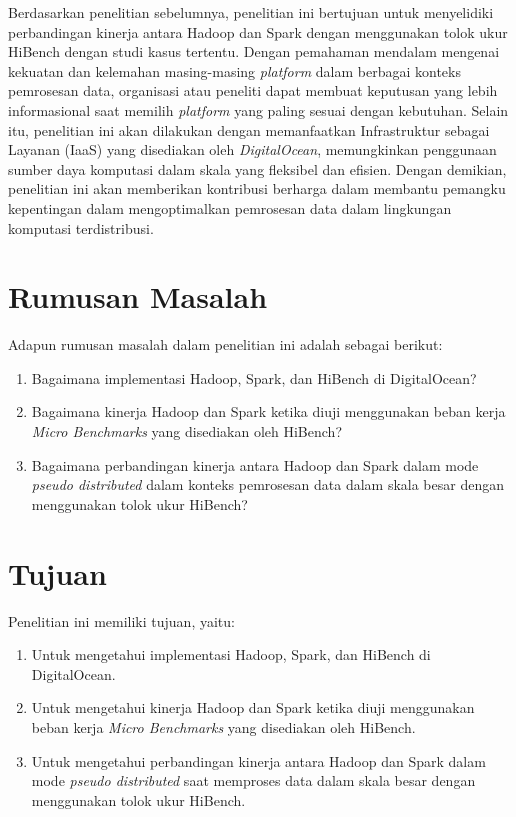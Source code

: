 Berdasarkan penelitian sebelumnya, penelitian ini bertujuan untuk menyelidiki perbandingan kinerja antara Hadoop dan Spark dengan menggunakan tolok ukur HiBench dengan studi kasus tertentu. Dengan pemahaman mendalam mengenai kekuatan dan kelemahan masing-masing \textit{platform} dalam berbagai konteks pemrosesan data, organisasi atau peneliti dapat membuat keputusan yang lebih informasional saat memilih \textit{platform} yang paling sesuai dengan kebutuhan. Selain itu, penelitian ini akan dilakukan dengan memanfaatkan Infrastruktur sebagai Layanan (IaaS) yang disediakan oleh \textit{DigitalOcean}, memungkinkan penggunaan sumber daya komputasi dalam skala yang fleksibel dan efisien. Dengan demikian, penelitian ini akan memberikan kontribusi berharga dalam membantu pemangku kepentingan dalam mengoptimalkan pemrosesan data dalam lingkungan komputasi terdistribusi.

\section{Rumusan Masalah}
Adapun rumusan masalah dalam penelitian ini adalah sebagai berikut:
\begin{enumerate}
	\item Bagaimana implementasi Hadoop, Spark, dan HiBench di DigitalOcean?
	\item Bagaimana kinerja Hadoop dan Spark ketika diuji menggunakan  beban kerja \textit{Micro Benchmarks} yang disediakan oleh HiBench?
	\item Bagaimana perbandingan kinerja antara Hadoop dan Spark dalam mode \textit{pseudo distributed} dalam konteks pemrosesan data dalam skala besar dengan menggunakan tolok ukur HiBench?
\end{enumerate}

\section{Tujuan}
Penelitian ini memiliki tujuan, yaitu:
	\begin{enumerate}
		\item Untuk mengetahui implementasi Hadoop, Spark, dan HiBench di DigitalOcean.
		\item Untuk mengetahui kinerja Hadoop dan Spark ketika diuji menggunakan  beban kerja \textit{Micro Benchmarks} yang disediakan oleh HiBench.
		\item Untuk mengetahui perbandingan kinerja antara Hadoop dan Spark dalam mode \textit{pseudo distributed} saat memproses data dalam skala besar dengan menggunakan tolok ukur HiBench.
	\end{enumerate}

